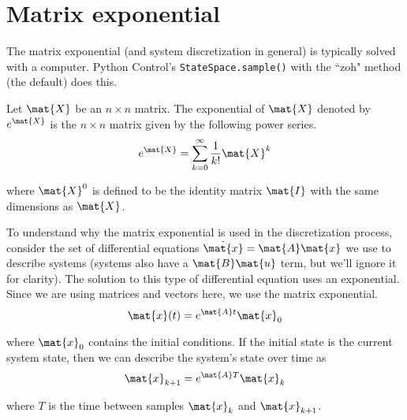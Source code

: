 \section{Matrix exponential}

The matrix exponential (and \gls{system} \gls{discretization} in general) is
typically solved with a computer. Python Control's \texttt{StateSpace.sample()}
with the ``zoh" method (the default) does this.
\begin{definition}
  Let $\mat{X}$ be an $n \times n$ matrix. The exponential of $\mat{X}$ denoted
  by $e^{\mat{X}}$ is the $n \times n$ matrix given by the following power
  series.
  \begin{equation}
    e^{\mat{X}} = \sum_{k=0}^\infty \frac{1}{k!} \mat{X}^k \label{eq:mat_exp}
  \end{equation}

  where $\mat{X}^0$ is defined to be the identity matrix $\mat{I}$ with the same
  dimensions as $\mat{X}$.
\end{definition}

To understand why the matrix exponential is used in the \gls{discretization}
process, consider the set of differential equations
$\dot{\mat{x}} = \mat{A}\mat{x}$ we use to describe \glspl{system}
(\glspl{system} also have a $\mat{B}\mat{u}$ term, but we'll ignore it for
clarity). The solution to this type of differential equation uses an
exponential. Since we are using matrices and vectors here, we use the matrix
exponential.
\begin{equation*}
  \mat{x}(t) = e^{\mat{A}t} \mat{x}_0
\end{equation*}

where $\mat{x}_0$ contains the initial conditions. If the initial \gls{state} is
the current system \gls{state}, then we can describe the \gls{system}'s
\gls{state} over time as
\begin{equation*}
  \mat{x}_{k+1} = e^{\mat{A}T} \mat{x}_k
\end{equation*}

where $T$ is the time between samples $\mat{x}_k$ and $\mat{x}_{k+1}$.
